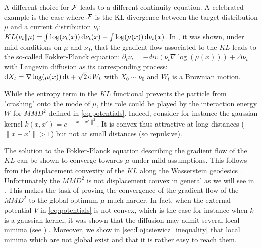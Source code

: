 \begin{remark}\label{remark:gradient_flow}
A different choice for ${{\mathcal F}}$  leads to a different continuity equation. A celebrated example is the case where ${{\mathcal F}}$ is the KL divergence between the target distribution $\mu$ and a current distribution $\nu_t$: $KL(\nu_t\Vert \mu ) =  \int \log (\nu_t(x))\mathop{}\!\mathrm{d} \nu_t(x) -\int \log(\mu(x))\mathop{}\!\mathrm{d} \nu_t(x)$. In \cite{jordan1998variational}, it was shown, under mild conditions on $\mu$ and $\nu_0$, that the gradient flow associated to the $KL$ leads to the so-called Fokker-Planck equation: $ \partial_t \nu_t = - div(\nu_t \nabla \log(\mu(x))) + \Delta \nu_t $ with Langevin diffusion as its corresponding process: $\mathop{}\!\mathrm{d} X_t = \nabla \log(\mu(x))\mathop{}\!\mathrm{d} t + \sqrt{2} \mathop{}\!\mathrm{d} W_t $ with $X_0\sim \nu_0$ and $W_t$ is a Brownian motion.
 
 While the entropy term in the $KL$ functional prevents the particle from "crashing" onto the mode of $\mu$, this role could be played by the interaction energy $W$ for $MMD^2$ defined in \cref{eq:potentials}. Indeed, consider for instance the gaussian kernel $k(x,x')=e^{-\|x-x'\|^2}$. It is convex thus attractive at long distances ($\|x-x'\|>1$) but not at small distances (so repulsive).


The solution to the Fokker-Planck equation describing the gradient flow of the $KL$ can be shown to converge towards $\mu$ under mild assumptions. This follows from the displacement convexity of the $KL$ along the Wasserstein geodesics . Unfortunately the $MMD^2$ is not displacement convex in general as we will see in . This makes the task of proving the convergence of the gradient flow of the $MMD^2$ to the global optimum $\mu$ much harder. In fact, when the external potential $V$ in \cref{eq:potentials} is not convex, which is the case for instance when $k$ is a gaussian kernel, it was shown that the diffusion may admit several local minima (see \cite{herrmann2010non,tugaut2014phase}) . Moreover, we show in \cref{sec:Lojasiewicz_inequality} that local minima which are not global exist and that it is rather easy to reach them.
\end{remark}
 






